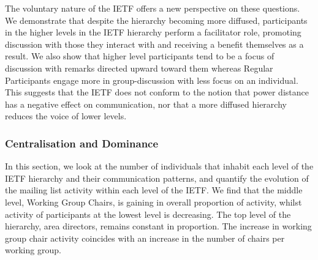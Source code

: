 \documentclass[twocolumn,10pt]{article}
\newcommand{\todo}[1]{\textbf{\textcolor{red}{To do: #1}}}
\begin{document}
The voluntary nature of the IETF offers a new perspective on these
questions.  We demonstrate that despite the hierarchy becoming more
diffused, participants in the higher levels in the IETF hierarchy perform a
facilitator role, promoting discussion with those they interact with and
receiving a benefit themselves as a result. We also show that higher level
participants tend to be a focus of discussion with remarks directed upward
toward them whereas Regular Participants engage more in group-discussion
with less focus on an individual.  This suggests that the IETF does not
conform to the notion that power distance has a negative effect on
communication, nor that a more diffused hierarchy reduces the voice of
lower levels.

% 
% 
% 
\subsubsection{Centralisation and Dominance}
\label{sec:org-dyn:hierarchy:rq1}




In this section, we look at the number of individuals that inhabit each
level of the IETF hierarchy and their communication patterns, and quantify
the evolution of the mailing list activity within each level of the IETF.
We find that the middle level, Working Group Chairs, is gaining in overall
proportion of activity, whilst activity of participants at the lowest level
is decreasing. The top level of the hierarchy, area directors, remains
constant in proportion. The increase in working group chair activity
coincides with an increase in the number of chairs per working group.
\end{document}
